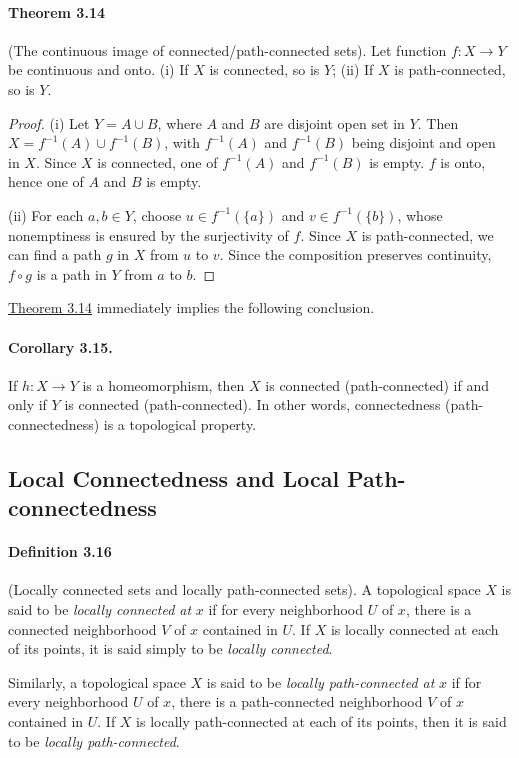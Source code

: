\documentclass{article}
\numberwithin{equation}{section}
\theoremstyle{plain}
\theoremstyle{definition}
\begin{document}
\paragraph{Theorem 3.14\label{thm:3.14}} (The continuous image of connected/path-connected sets). Let function $f:X\to Y$ be continuous and onto. (i) If $X$ is connected, so is $Y$; (ii) If $X$ is path-connected, so is $Y$.
\begin{proof}
(i) Let $Y=A\cup B$, where $A$ and $B$ are disjoint open set in $Y$. Then $X=f^{-1}(A)\cup f^{-1}(B)$, with $f^{-1}(A)$ and $f^{-1}(B)$ being disjoint and open in $X$. Since $X$ is connected, one of $f^{-1}(A)$ and $f^{-1}(B)$ is empty. $f$ is onto, hence one of $A$ and $B$ is empty.

(ii) For each $a,b\in Y$, choose $u\in f^{-1}(\{a\})$ and $v\in f^{-1}(\{b\})$, whose nonemptiness is ensured by the surjectivity of $f$. Since $X$ is path-connected, we can find a path $g$ in $X$ from $u$ to $v$. Since the composition preserves continuity, $f\circ g$ is a path in $Y$ from $a$ to $b$.
\end{proof}
\hyperref[thm:3.14]{Theorem 3.14} immediately implies the following conclusion.
\paragraph{Corollary 3.15.\label{cor:3.15}} If $h:X\to Y$ is a homeomorphism, then $X$ is connected (path-connected) if and only if $Y$ is connected (path-connected). In other words, connectedness (path-connectedness) is a topological property.

\subsection{Local Connectedness and Local Path-connectedness}
\paragraph{Definition 3.16\label{def:3.16}} (Locally connected sets and locally path-connected sets). A topological space $X$ is said to be \textit{locally connected at} $x$ if for every neighborhood $U$ of $x$, there is a connected neighborhood $V$ of $x$ contained in $U$. If $X$ is locally connected at each of its points, it is said simply to be \textit{locally connected}. 

Similarly, a topological space $X$ is said to be \textit{locally path-connected at} $x$ if for every neighborhood $U$ of $x$, there is a path-connected neighborhood $V$ of $x$ contained in $U$. If $X$ is locally path-connected at each of its points, then it is said to be \textit{locally path-connected}.
\end{document}
